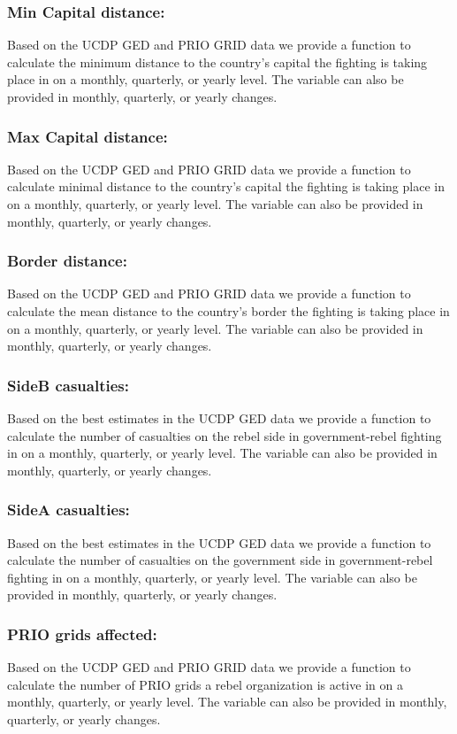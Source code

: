 \documentclass[11pt,oneside,fullpage]{amsart}
\begin{document}
\subsubsection{\textbf{Min Capital distance:}} Based on the UCDP GED and PRIO GRID data we provide a function to calculate the minimum distance to the country's capital the fighting is taking place in on a monthly, quarterly, or yearly level. The variable can also be provided in monthly, quarterly, or yearly changes.
\subsubsection{\textbf{Max Capital distance:}} Based on the UCDP GED and PRIO GRID data we provide a function to calculate minimal distance to the country's capital the fighting is taking place in on a monthly, quarterly, or yearly level. The variable can also be provided in monthly, quarterly, or yearly changes.
\subsubsection{\textbf{Border distance:}} Based on the UCDP GED and PRIO GRID data we provide a function to calculate the mean distance to the country's border the fighting is taking place in on a monthly, quarterly, or yearly level. The variable can also be provided in monthly, quarterly, or yearly changes.
\subsubsection{\textbf{SideB casualties:}} Based on the best estimates in the UCDP GED data we provide a function to calculate the number of casualties on the rebel side in government-rebel fighting in on a monthly, quarterly, or yearly level. The variable can also be provided in monthly, quarterly, or yearly changes.
\subsubsection{\textbf{SideA casualties:}} Based on the best estimates in the UCDP GED data we provide a function to calculate the number of casualties on the government side in government-rebel fighting in on a monthly, quarterly, or yearly level. The variable can also be provided in monthly, quarterly, or yearly changes.
\subsubsection{\textbf{PRIO grids affected:}} Based on the UCDP GED and PRIO GRID data we provide a function to calculate the number of PRIO grids a rebel organization is active in on a monthly, quarterly, or yearly level. The variable can also be provided in monthly, quarterly, or yearly changes.
\end{document}
